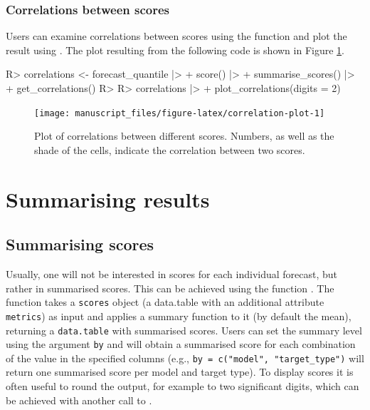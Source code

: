 \documentclass[
]{jss}
\begin{document}
\subsubsection{Correlations between
scores}\label{correlations-between-scores}

Users can examine correlations between scores using the function
 and plot the result using
. The plot resulting from the following code
is shown in Figure \ref{fig:correlation-plot}.

\begin{CodeChunk}
\begin{CodeInput}
R> correlations <- forecast_quantile |>
+   score() |>
+   summarise_scores() |>
+   get_correlations()
R> 
R> correlations |>
+   plot_correlations(digits = 2)
\end{CodeInput}
\begin{figure}[!h]

{\centering \texttt{[image: manuscript\_files/figure-latex/correlation-plot-1]} 

}

\caption[Plot of correlations between different scores]{Plot of correlations between different scores. Numbers, as well as the shade of the cells, indicate the correlation between two scores.}\label{fig:correlation-plot}
\end{figure}
\end{CodeChunk}

\section{Summarising results} \label{sec:summarising}

\subsection{Summarising scores}\label{summarising-scores}

Usually, one will not be interested in scores for each individual
forecast, but rather in summarised scores. This can be achieved using
the function . The function takes a
\texttt{scores} object (a data.table with an additional attribute
\texttt{metrics}) as input and applies a summary function to it (by
default the mean), returning a \texttt{data.table} with summarised
scores. Users can set the summary level using the argument \texttt{by}
and will obtain a summarised score for each combination of the value in
the specified columns (e.g., \texttt{by\ =\ c("model",\ "target\_type")}
will return one summarised score per model and target type). To display
scores it is often useful to round the output, for example to two
significant digits, which can be achieved with another call to
.
\end{document}
